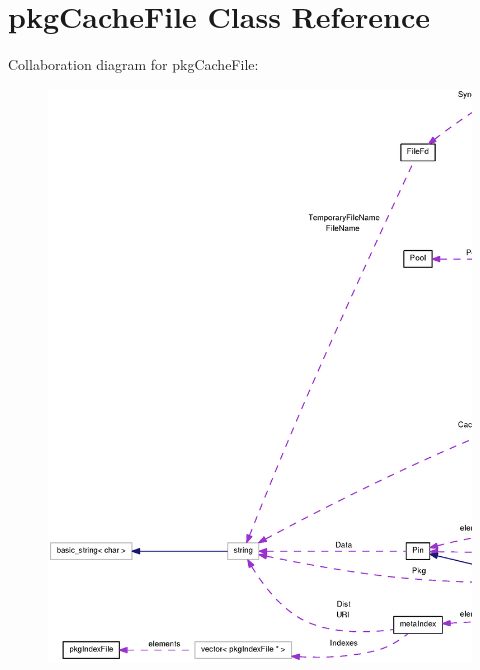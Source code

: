 \section{pkg\-Cache\-File \-Class \-Reference}
\label{classpkgCacheFile}


\-Collaboration diagram for pkg\-Cache\-File\-:
\nopagebreak
\begin{figure}[H]
\begin{center}
\leavevmode
\includegraphics[width=350pt]{classpkgCacheFile__coll__graph}
\end{center}
\end{figure}
